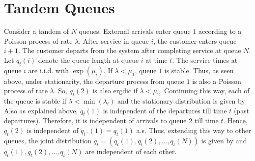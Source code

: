 \documentclass[all-lectures.tex]{subfiles}
\begin{document}
\section{Tandem Queues}
Consider a tandem of $N$ queues. External arrivals enter queue $1$ according to a Poisson process of rate $\lambda$. After service in queue $i$, the customer enters queue $i+1$. The customer departs from the system after completing service at queue $N$. Let $q_t(i)$ denote the queue length at queue $i$ at time $t$. The service times at queue $i$ are i.i.d. with $\exp(\mu_i)$. If $\lambda < \mu_1$, queue $1$ is stable. Thus, as seen above, under stationarity, the departure process from queue $1$ is also a Poisson process of rate $\lambda$. So, $q_t(2)$ is also ergdic if $\lambda < \mu_2$. Continuing this way, each of the queue is stable if $\lambda < \min(\lambda_i)$ and the stationary distribution is given by
Also as explained above, $q_{t}(1)$ is independent of the departures till time $t$ (past departures). Therefore, it is independent of arrivals to queue $2$ till time $t$. Hence, $q_t(2)$ is independent of $q_{t^-}(1) = q_t(1)$ a.s. Thus, extending this way to other queues, the joint distribution $q_t = (q_t(1), q_t(2), \dots , q_t(N))$ is given by
and $q_t(1), q_t(2), \dots , q_t(N)$ are independent of each other. \\
\end{document}
